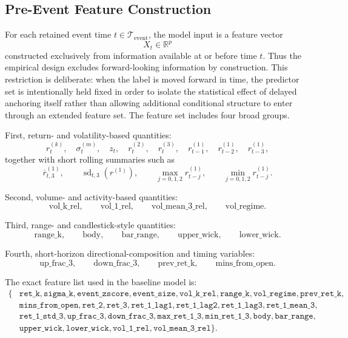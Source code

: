 \documentclass[11pt,a4paper]{article}
\begin{document}
	\subsection{Pre-Event Feature Construction}

	For each retained event time \(t \in \mathcal{T}_{\mathrm{event}}\), the model input is a feature vector
	\[
	X_t \in \mathbb{R}^p
	\]
	constructed exclusively from information available at or before time \(t\). Thus the empirical design excludes forward-looking information by construction. This restriction is deliberate: when the label is moved forward in time, the predictor set is intentionally held fixed in order to isolate the statistical effect of delayed anchoring itself rather than allowing additional conditional structure to enter through an extended feature set. The feature set includes four broad groups.

	First, return- and volatility-based quantities:
	\[
	r_t^{(k)},\quad \sigma_t^{(m)},\quad z_t,\quad r_t^{(2)},\quad r_t^{(3)},\quad r_{t-1}^{(1)},\quad r_{t-2}^{(1)},\quad r_{t-3}^{(1)},
	\]
	together with short rolling summaries such as
	\[
	\overline r_{t,3}^{(1)},\qquad \operatorname{sd}_{t,3}\!\left(r^{(1)}\right),\qquad \max_{j=0,1,2} r_{t-j}^{(1)},\qquad \min_{j=0,1,2} r_{t-j}^{(1)}.
	\]

	Second, volume- and activity-based quantities:
	\[
	\text{vol\_k\_rel},\qquad \text{vol\_1\_rel},\qquad \text{vol\_mean\_3\_rel},\qquad \text{vol\_regime}.
	\]

	Third, range- and candlestick-style quantities:
	\[
	\text{range\_k},\qquad \text{body},\qquad \text{bar\_range},\qquad \text{upper\_wick},\qquad \text{lower\_wick}.
	\]

	Fourth, short-horizon directional-composition and timing variables:
	\[
	\text{up\_frac\_3},\qquad \text{down\_frac\_3},\qquad \text{prev\_ret\_k},\qquad \text{mins\_from\_open}.
	\]

	The exact feature list used in the baseline model is:
	\[
	\begin{aligned}
	\{&\texttt{ret\_k},\texttt{sigma\_k},\texttt{event\_zscore},\texttt{event\_size},\texttt{vol\_k\_rel},\texttt{range\_k},\texttt{vol\_regime},\texttt{prev\_ret\_k},\\
	&\texttt{mins\_from\_open},\texttt{ret\_2},\texttt{ret\_3},\texttt{ret\_1\_lag1},\texttt{ret\_1\_lag2},\texttt{ret\_1\_lag3},\texttt{ret\_1\_mean\_3},\\
	&\texttt{ret\_1\_std\_3},\texttt{up\_frac\_3},\texttt{down\_frac\_3},\texttt{max\_ret\_1\_3},\texttt{min\_ret\_1\_3},\texttt{body},\texttt{bar\_range},\\
	&\texttt{upper\_wick},\texttt{lower\_wick},\texttt{vol\_1\_rel},\texttt{vol\_mean\_3\_rel}\}.
	\end{aligned}
	\]
\end{document}
